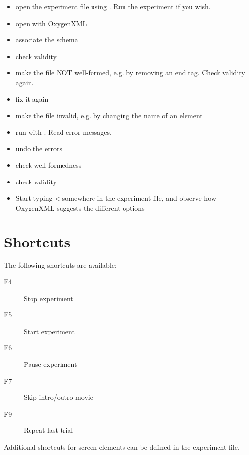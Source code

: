\begin{itemize}

\item open the experiment file
 using \apex. Run the
experiment if you wish.

\item open with OxygenXML

\item associate the \apex schema

\item check validity

\item make the file NOT well-formed, e.g. by removing an end tag.
Check validity again.

\item fix it again

\item make the file invalid, e.g. by changing the name of an
element

\item run with \apex. Read error messages.

\item undo the errors

\item check well-formedness

\item check validity

\item Start typing < somewhere in the experiment file, and observe how OxygenXML suggests the different options



\end{itemize}







\section{Shortcuts}

The following shortcuts are available:

\begin{description}
\item[F4] Stop experiment
\item[F5] Start experiment
\item[F6] Pause experiment
\item[F7] Skip intro/outro movie
\item[F9] Repeat last trial
\end{description}

Additional shortcuts for screen elements can be defined in the experiment file.

